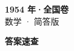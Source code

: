 \documentclass[zihao=-4, a4paper]{ctexart}
\begin{document}
\begin{center}
  {\Large\bfseries 1954 年·全国卷}\\[4pt]
  {\large 数学 · 简答版}
\end{center}
\medskip
{}

\clearpage
{}
\begin{center}{\Large\bfseries 答案速查}\end{center}
\medskip

\end{document}
